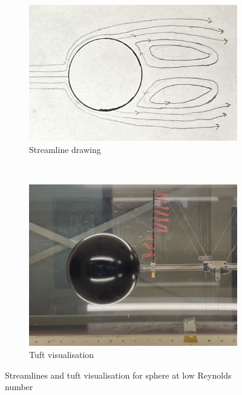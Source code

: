 \documentclass[8pt]{article}
\begin{document}
\begin{figure}[H]
    \centering
    \begin{subfigure}[t]{0.48\textwidth}
        \centering
        \includegraphics[width=1\textwidth]{Images_Videos/stream_low_Re_sphere_2.jpg}
        \caption{Streamline drawing}
        \label{fig:figure6}
    \end{subfigure}
    ~
    \begin{subfigure}[t]{0.4\textwidth}
        \centering
        \includegraphics[width=1\textwidth]{Images_Videos/sphere_low_Re.jpg}
        \caption{Tuft visualisation}
        \label{fig:figure7}
    \end{subfigure}
    \caption{Streamlines and tuft visualisation for sphere at low Reynolds number}
\end{figure}
\end{document}
